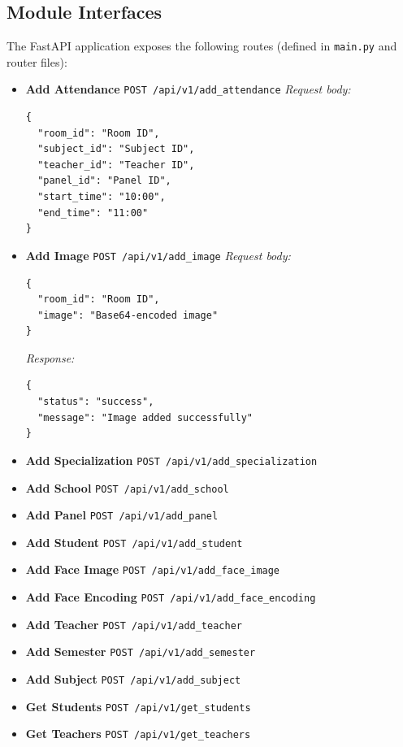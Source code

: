 \documentclass[openany]{report}
\begin{document}
\subsection*{Module Interfaces}
The FastAPI application exposes the following routes (defined in \texttt{main.py} and router files):

\begin{itemize}
  \item \textbf{Add Attendance}  
    \texttt{POST /api/v1/add\_attendance}  
    \textit{Request body:}
    \begin{verbatim}
{
  "room_id": "Room ID",
  "subject_id": "Subject ID",
  "teacher_id": "Teacher ID",
  "panel_id": "Panel ID",
  "start_time": "10:00",
  "end_time": "11:00"
}
    \end{verbatim}

  \item \textbf{Add Image}  
    \texttt{POST /api/v1/add\_image}  
    \textit{Request body:}
    \begin{verbatim}
{
  "room_id": "Room ID",
  "image": "Base64-encoded image"
}
    \end{verbatim}
    \textit{Response:}
    \begin{verbatim}
{
  "status": "success",
  "message": "Image added successfully"
}
    \end{verbatim}

  \item \textbf{Add Specialization}  
    \texttt{POST /api/v1/add\_specialization}

  \item \textbf{Add School}  
    \texttt{POST /api/v1/add\_school}

  \item \textbf{Add Panel}  
    \texttt{POST /api/v1/add\_panel}

  \item \textbf{Add Student}  
    \texttt{POST /api/v1/add\_student}

  \item \textbf{Add Face Image}  
    \texttt{POST /api/v1/add\_face\_image}

  \item \textbf{Add Face Encoding}  
    \texttt{POST /api/v1/add\_face\_encoding}

  \item \textbf{Add Teacher}  
    \texttt{POST /api/v1/add\_teacher}

  \item \textbf{Add Semester}  
    \texttt{POST /api/v1/add\_semester}

  \item \textbf{Add Subject}  
    \texttt{POST /api/v1/add\_subject}

  \item \textbf{Get Students}  
    \texttt{POST /api/v1/get\_students}

  \item \textbf{Get Teachers}  
    \texttt{POST /api/v1/get\_teachers}
\end{itemize}
\end{document}
